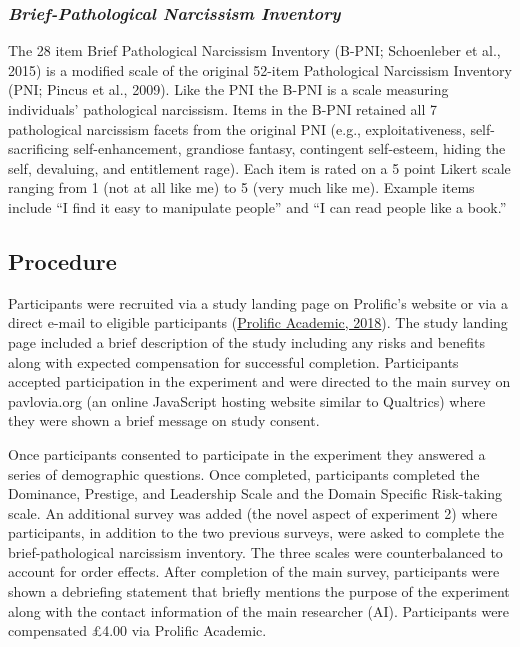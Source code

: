 \documentclass[
  donotrepeattitle,doc, 12pt, a4paper,floatsintext]{apa7}
\begin{document}
\hypertarget{brief-pathological-narcissism-inventory}{%
\subsubsection{\texorpdfstring{\emph{Brief-Pathological Narcissism Inventory}}{Brief-Pathological Narcissism Inventory}}\label{brief-pathological-narcissism-inventory}}

The 28 item Brief Pathological Narcissism Inventory (B-PNI; Schoenleber et al., 2015) is a modified scale of the original 52-item Pathological Narcissism Inventory (PNI; Pincus et al., 2009). Like the PNI the B-PNI is a scale measuring individuals' pathological narcissism. Items in the B-PNI retained all 7 pathological narcissism facets from the original PNI (e.g., exploitativeness, self-sacrificing self-enhancement, grandiose fantasy, contingent self-esteem, hiding the self, devaluing, and entitlement rage). Each item is rated on a 5 point Likert scale ranging from 1 (not at all like me) to 5 (very much like me). Example items include ``I find it easy to manipulate people'' and ``I can read people like a book.''

\hypertarget{procedure-1}{%
\subsection{Procedure}\label{procedure-1}}

Participants were recruited via a study landing page on Prolific's website or via a direct e-mail to eligible participants (\protect\hyperlink{ref-prolificacademic2018}{Prolific Academic, 2018}). The study landing page included a brief description of the study including any risks and benefits along with expected compensation for successful completion. Participants accepted participation in the experiment and were directed to the main survey on pavlovia.org (an online JavaScript hosting website similar to Qualtrics) where they were shown a brief message on study consent.

Once participants consented to participate in the experiment they answered a series of demographic questions. Once completed, participants completed the Dominance, Prestige, and Leadership Scale and the Domain Specific Risk-taking scale. An additional survey was added (the novel aspect of experiment 2) where participants, in addition to the two previous surveys, were asked to complete the brief-pathological narcissism inventory. The three scales were counterbalanced to account for order effects. After completion of the main survey, participants were shown a debriefing statement that briefly mentions the purpose of the experiment along with the contact information of the main researcher (AI). Participants were compensated £4.00 via Prolific Academic.
\end{document}
